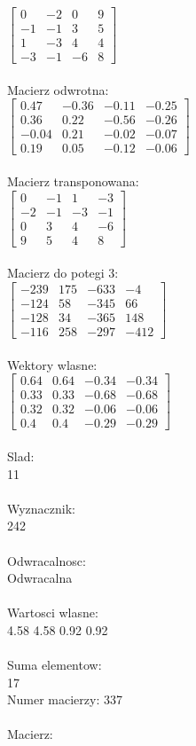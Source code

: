 \documentclass[a4paper,12pt]{article}
\begin{document}
$\begin{bmatrix} 0&-2&0&9\\-1&-1&3&5\\1&-3&4&4\\-3&-1&-6&8 \end{bmatrix}$
\\
\\
Macierz odwrotna:\\

$\begin{bmatrix} 0.47&-0.36&-0.11&-0.25\\0.36&0.22&-0.56&-0.26\\-0.04&0.21&-0.02&-0.07\\0.19&0.05&-0.12&-0.06 \end{bmatrix}$
\\
\\
Macierz transponowana:\\

$\begin{bmatrix} 0&-1&1&-3\\-2&-1&-3&-1\\0&3&4&-6\\9&5&4&8 \end{bmatrix}$
\\
\\
Macierz do potegi 3:\\

$\begin{bmatrix} -239&175&-633&-4\\-124&58&-345&66\\-128&34&-365&148\\-116&258&-297&-412 \end{bmatrix}$
\\
\\
Wektory wlasne:\\

$\begin{bmatrix} 0.64&0.64&-0.34&-0.34\\0.33&0.33&-0.68&-0.68\\0.32&0.32&-0.06&-0.06\\0.4&0.4&-0.29&-0.29 \end{bmatrix}$
\\
\\
Slad:\\
11
\\
\\
Wyznacznik:\\
242
\\
\\
Odwracalnosc:\\
Odwracalna
\\
\\
Wartosci wlasne:\\
4.58 4.58 0.92 0.92
\\
\\
Suma elementow:\\
17
\\
\newpage
Numer macierzy:
337
\\
\\
Macierz:\\
\end{document}
